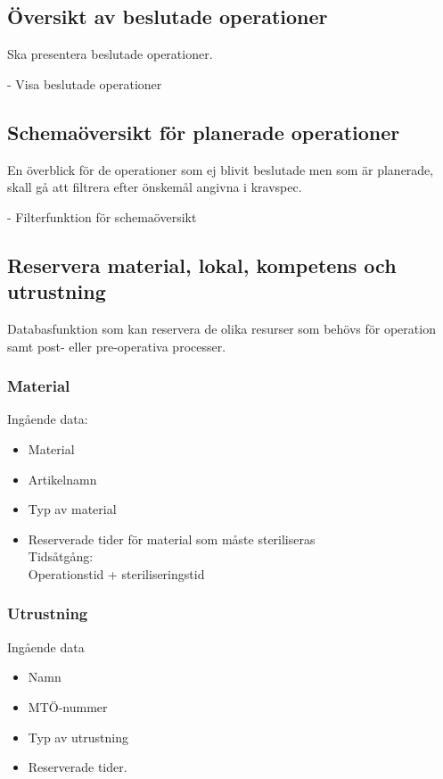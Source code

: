 \documentclass[a4paper,10pt, twoside]{article}
\begin{document}
\subsection{Översikt av beslutade operationer}
\label{sec: Översikt av beslutade operationer}
Ska presentera beslutade operationer.

-	Visa beslutade operationer
\subsection{Schemaöversikt för planerade operationer}
\label{sec: Schemaöversikt för planerade operationer}
En överblick för de operationer som ej blivit beslutade men som är planerade, skall gå att filtrera efter önskemål angivna i kravspec.

-	Filterfunktion för schemaöversikt

\clearpage
\subsection{Reservera material, lokal, kompetens och utrustning}
\label{sec: Resevera material, lokal, kompetens och utrustning}
Databasfunktion som kan reservera de olika resurser som behövs för operation samt post- eller pre-operativa processer.
\subsubsection{Material}
\label{Material}
Ingående data:
\begin{multicols}{2}
\begin{itemize}
	\item Material
	\item Artikelnamn
	\item Typ av material
	\item Reserverade tider för material som måste steriliseras \\Tidsåtgång: \\ Operationstid + steriliseringstid
\end{itemize}
\end{multicols}

\subsubsection{Utrustning}
\label{sec: Utrustning}
Ingående data
\begin{multicols}{2}
\begin{itemize}
	\item Namn
	\item MTÖ-nummer
	\item Typ av utrustning
	\item Reserverade tider.
\end{itemize}
\end{multicols}
\end{document}
